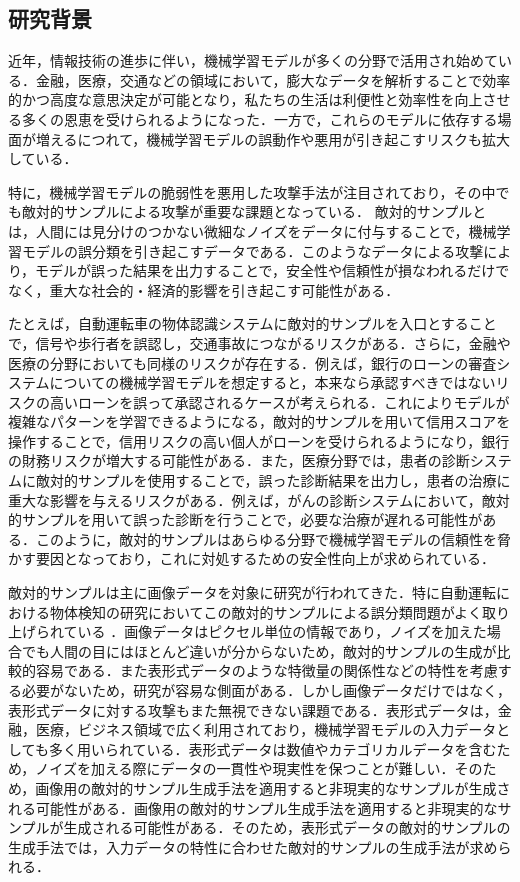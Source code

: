 \subsection{研究背景}
近年，情報技術の進歩に伴い，機械学習モデルが多くの分野で活用され始めている．金融，医療，交通などの領域において，膨大なデータを解析することで効率的かつ高度な意思決定が可能となり，私たちの生活は利便性と効率性を向上させる多くの恩恵を受けられるようになった．一方で，これらのモデルに依存する場面が増えるにつれて，機械学習モデルの誤動作や悪用が引き起こすリスクも拡大している．

特に，機械学習モデルの脆弱性を悪用した攻撃手法が注目されており，その中でも敵対的サンプルによる攻撃が重要な課題となっている\cite{AdversarialMachineLearning:BayesianPerspectives}．
敵対的サンプルとは，人間には見分けのつかない微細なノイズをデータに付与することで，機械学習モデルの誤分類を引き起こすデータである\cite{AdversarialMachineLearning:BayesianPerspectives}．このようなデータによる攻撃により，モデルが誤った結果を出力することで，安全性や信頼性が損なわれるだけでなく，重大な社会的・経済的影響を引き起こす可能性がある．

たとえば，自動運転車の物体認識システムに敵対的サンプルを入口とすることで，信号や歩行者を誤認し，交通事故につながるリスクがある\cite{AdversarialMachineLearning:BayesianPerspectives}．さらに，金融や医療の分野においても同様のリスクが存在する．例えば，銀行のローンの審査システムについての機械学習モデルを想定すると，本来なら承認すべきではないリスクの高いローンを誤って承認されるケースが考えられる．これによりモデルが複雑なパターンを学習できるようになる，敵対的サンプルを用いて信用スコアを操作することで，信用リスクの高い個人がローンを受けられるようになり，銀行の財務リスクが増大する可能性がある．また，医療分野では，患者の診断システムに敵対的サンプルを使用することで，誤った診断結果を出力し，患者の治療に重大な影響を与えるリスクがある．例えば，がんの診断システムにおいて，敵対的サンプルを用いて誤った診断を行うことで，必要な治療が遅れる可能性がある．このように，敵対的サンプルはあらゆる分野で機械学習モデルの信頼性を脅かす要因となっており，これに対処するための安全性向上が求められている．


敵対的サンプルは主に画像データを対象に研究が行われてきた．特に自動運転における物体検知の研究においてこの敵対的サンプルによる誤分類問題がよく取り上げられている
\cite{DeepLearningAutonomousDriving}\cite{rios2021adversarial}\cite{joshi2021insider}．画像データはピクセル単位の情報であり，ノイズを加えた場合でも人間の目にはほとんど違いが分からないため，敵対的サンプルの生成が比較的容易である．また表形式データのような特徴量の関係性などの特性を考慮する必要がないため，研究が容易な側面がある．しかし画像データだけではなく，表形式データに対する攻撃もまた無視できない課題である．表形式データは，金融，医療，ビジネス領域で広く利用されており，機械学習モデルの入力データとしても多く用いられている．表形式データは数値やカテゴリカルデータを含むため，ノイズを加える際にデータの一貫性や現実性を保つことが難しい．そのため，画像用の敵対的サンプル生成手法を適用すると非現実的なサンプルが生成される可能性がある．画像用の敵対的サンプル生成手法を適用すると非現実的なサンプルが生成される可能性がある．そのため，表形式データの敵対的サンプルの生成手法では，入力データの特性に合わせた敵対的サンプルの生成手法が求められる．

